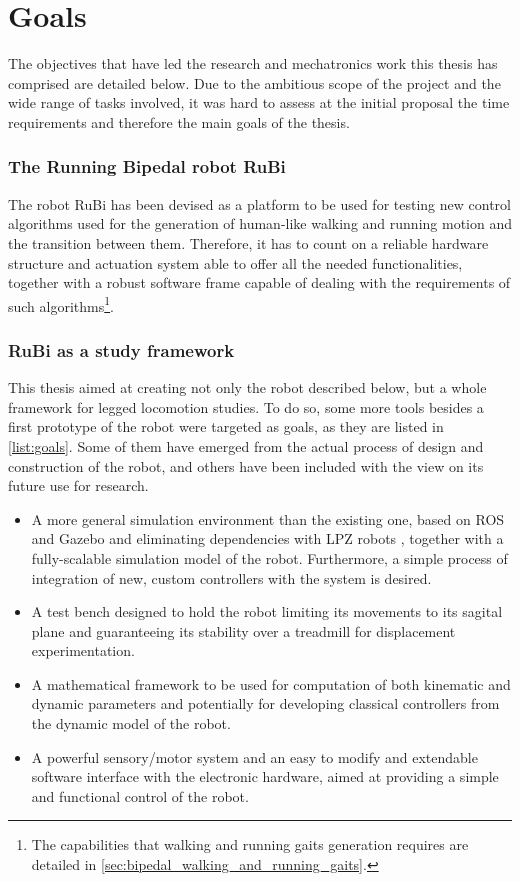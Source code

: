 \section{Goals}
\label{sec:goals}
The objectives that have led the research and mechatronics work this thesis has comprised are detailed below.
Due to the ambitious scope of the project and the wide range of tasks involved, it was hard to assess at the initial proposal the time requirements and therefore the main goals of the thesis. 

\subsubsection{The Running Bipedal robot RuBi} %
\label{ssub:the_running_bipedal_robot_rubi}
The robot RuBi has been devised as a platform to be used for testing new control algorithms used for the generation of human-like walking and running motion and the transition between them.
Therefore, it has to count on a reliable hardware structure and actuation system able to offer all the needed functionalities, together with a robust software frame capable of dealing with the requirements of such algorithms\footnote{The capabilities that walking and running gaits generation requires are detailed in \ref{sec:bipedal_walking_and_running_gaits}.}.


\subsubsection{RuBi as a study framework} %
\label{ssub:rubi_as_a_study_framework}
This thesis aimed at creating not only the robot described below, but a whole framework for legged locomotion studies.
To do so, some more tools besides a first prototype of the robot were targeted as goals, as they are listed in \ref{list:goals}.
Some of them have emerged from the actual process of design and construction of the robot, and others have been included with the view on its future use for research.

\begin{itemize}
\label{list:goals}
\item A more general simulation environment than the existing one, based on ROS and Gazebo and eliminating dependencies with LPZ robots \cite{lpzrobots}, together with a fully-scalable simulation model of the robot. Furthermore, a simple process of integration of new, custom controllers with the system is desired.
\item A test bench designed to hold the robot limiting its movements to its sagital plane and guaranteeing its stability over a treadmill for displacement experimentation. 
\item A mathematical framework to be used for computation of both kinematic and dynamic parameters and potentially for developing classical controllers from the dynamic model of the robot.
\item A powerful sensory/motor system and an easy to modify and extendable software interface with the electronic hardware, aimed at providing a simple and functional control of the robot.
\end{itemize}

